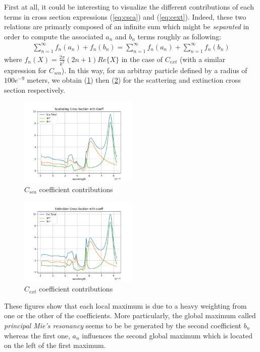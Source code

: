 \documentclass{article}
\numberwithin{equation}{section}
\begin{document}
First at all, it could be interesting to visualize the different contributions of each terms in cross section expressions (\ref{eq:csca}) and (\ref{eq:cext}). Indeed, these two relations are primarly composed of an infinite sum which might be \textit{separated} in order to compute the associated $a_{n}$ and $b_{n}$ terms roughly as following:
\begin{align}
\sum_{n=1}^{\infty } f_{n}(a_{n}) + f_{n}(b_{n}) = \sum_{n=1}^{\infty } f_{n}(a_{n}) + \sum_{n=1}^{\infty } f_{n}(b_{n})
\end{align}
where $f_{n}(X) = \frac{2\pi}{k^{2}}(2n+1)Re\{X\}$ in the case of $C_{ext}$ (with a similar expression for $C_{sca}$). In this way, for an arbitray particle defined by a radius of $100e^{-9}$ meters, we obtain (\ref{fig:sca_coeff}) then (\ref{fig:ext_coeff}) for the scattering and extinction cross section respectively.
\begin{figure}[h]
    \centering
    \includegraphics[width=0.5\textwidth, height=0.4\textwidth]{sca_coeff.png}
    \caption{$C_{sca}$ coefficient contributions}
    \label{fig:sca_coeff}
\end{figure}
\begin{figure}[h]
    \centering
    \includegraphics[width=0.5\textwidth, height=0.4\textwidth]{ext_coeff.png}
    \caption{$C_{ext}$ coefficient contributions}
    \label{fig:ext_coeff}
\end{figure}
These figures show that each local maximum is due to a heavy weighting from one or the other of the coefficients. More particularly, the global maximum called \textit{principal Mie's resonancy} seems to be be generated by the second coefficient $b_{n}$ whereas the first one, $a_{n}$ influences the second global maximum which is located on the left of the first maximum.
\end{document}
